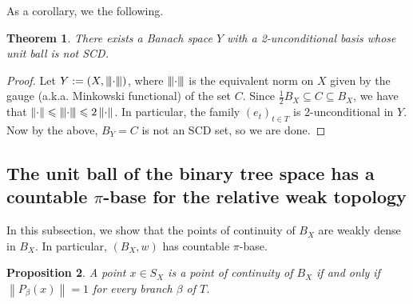 \documentclass[11pt,a4paper,reqno]{amsart}
\numberwithin{equation}{section}
\newcommand{\norm}[1]{\left\lVert#1\right\rVert}
\newcommand{\nnorm}[1]{{\left\vert\kern-0.25ex\left\vert\kern-0.25ex\left\vert #1%
    \right\vert\kern-0.25ex\right\vert\kern-0.25ex\right\vert}}
\newcommand{\1}{\mathbbm{1}}
\renewcommand{\leq}{\leqslant}
\theoremstyle{plain}
\newtheorem{theorem}{Theorem}[section]
\newtheorem{proposition}[theorem]{Proposition}
\theoremstyle{definition}
\begin{document}
As a corollary, we the following. 

\begin{theorem}
    There exists a Banach space $Y$ with a 2-unconditional basis whose unit ball is not SCD.
\end{theorem}

\begin{proof}
    Let $Y:=(X,\nnorm{\cdot})$, where $\nnorm{\cdot}$ is the equivalent norm on $X$ given by the gauge (a.k.a. Minkowski functional) of the set $C$. Since $\frac{1}{2}B_X\subseteq C \subseteq B_X$, we have that $\norm{\cdot}\leq \nnorm{\cdot}\leq 2\norm{\cdot}$. In particular, the family $(e_t)_{t\in T}$ is 2-unconditional in $Y$. Now by the above, $B_Y=C$ is not an SCD set, so we are done.

\end{proof}

\subsection{The unit ball of the binary tree space has a countable $\pi$-base for the relative weak topology}\label{subsec:weak_density_of_points_of_continuity} In this subsection, we show that the points of continuity of $B_X$ are weakly dense in $B_X$. In particular, $(B_X,w)$ has countable $\pi$-base.

\begin{proposition}\label{prop:points_of_continuity_characterization}
    A point $x\in S_X$ is a point of continuity of $B_X$ if and only if $\norm{P_{\beta}(x)}=1$ for every branch $\beta$ of $T$.
\end{proposition}
\end{document}
